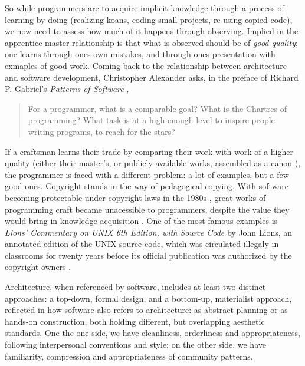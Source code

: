 So while programmers are to acquire implicit knowledge through a process of learning by doing (realizing koans, coding small projects, re-using copied code), we now need to assess how much of it happens through observing. Implied in the apprentice-master relationship is that what is observed should be of \emph{good quality}; one learns through ones own mistakes, and through ones presentation with exmaples of good work. Coming back to the relationship between architecture and software development, Christopher Alexander asks, in the preface of Richard P. Gabriel's \emph{Patterns of Software} \citep{gabriel_patterns_1998},

\begin{quote}
  For a programmer, what is a comparable goal? What is the Chartres of programming? What task is at a high enough level to inspire people writing programs, to reach for the stars?
\end{quote}

If a craftsman learns their trade by comparing their work with work of a higher quality (either their master's, or publicly available works, assembled as a canon \citep{taylor_patterns_2001}), the programmer is faced with a different problem: a lot of examples, but a few good ones.  Copyright stands in the way of pedagogical copying. With software becoming protectable under copyright laws in the 1980s \citep{oman_computer_2018}, great works of programming craft became unacessible to programmers, despite the value they would bring in knowledge acquisition \citep{gabriel_mob_2001}. One of the most famous examples is \emph{Lions' Commentary on UNIX 6th Edition, with Source Code} by John Lions, an annotated edition of the UNIX source code, which was circulated illegaly in classrooms for twenty years before its official publication was authorized by the copyright owners \citep{lions_lions_1996}.

\spacer

Architecture, when referenced by software, includes at least two distinct approaches: a top-down, formal design, and a bottom-up, materialist approach, reflected in how software also refers to architecture: as abstract planning or as hands-on construction, both holding different, but overlapping aesthetic standards. One the one side, we have cleanliness, orderliness and appropriateness, following interpersonal conventions and style; on the other side, we have familiarity, compression and appropriateness of community patterns.

